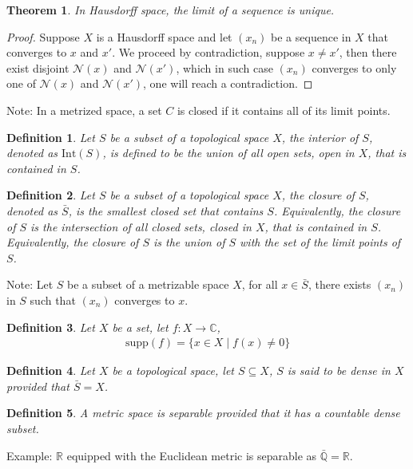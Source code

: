 \documentclass[11pt]{book}
\theoremstyle{break}
\theoremstyle{break}
\newtheorem{thm}{Theorem}[section]
\newtheorem{defn}{Definition}[corL]
\newcommand{\R}{\mathbb{R}}
\newcommand{\Q}{\mathbb{Q}}
\newcommand{\C}{\mathbb{C}}
\newcommand{\Int}{\text{Int}}
\newcommand{\supp}{\text{supp}}
\newcommand{\note}{\color{red}Note: \color{black}}
\newcommand{\example}{\color{green}Example: \color{black}}
\begin{document}
\begin{thm}
In Hausdorff space, the limit of a sequence is unique. 
\end{thm}
\begin{proof}
Suppose $X$ is a Hausdorff space and let $(x_n)$ be a sequence in $X$ that converges to $x$ and $x'$. We proceed by contradiction, suppose $x \neq x'$, then there exist disjoint $\mathcal{N}(x)$ and $\mathcal{N}(x')$, which in such case $(x_n)$ converges to only one of $\mathcal{N}(x)$ and $\mathcal{N}(x')$, one will reach a contradiction.
\end{proof}

\note In a metrized space, a set $C$ is closed if it contains all of its limit points. 

\begin{defn}
Let $S$ be a subset of a topological space $X$, the interior of $S$, denoted as $\Int(S)$, is defined to be the union of all open sets, open in $X$, that is contained in $S$. 
\end{defn}

\begin{defn}
Let $S$ be a subset of a topological space $X$, the closure of $S$, denoted as $\bar{S}$, is the smallest closed set that contains $S$. Equivalently, the closure of $S$ is the intersection of all closed sets, closed in $X$, that is contained in $S$. Equivalently, the closure of $S$ is the union of $S$ with the set of the limit points of $S$. 
\end{defn}

\note Let $S$ be a subset of a metrizable space $X$, for all $x \in \bar{S}$, there exists $(x_n)$ in $S$ such that $(x_n)$ converges to $x$. 

\begin{defn}
Let $X$ be a set, let $f:X \to \C$, 
\begin{align*}
\supp(f)=\{ x \in X\mid f(x) \neq 0\}
\end{align*}
\end{defn}

\begin{defn}
Let $X$ be a topological space, let $S\subseteq X$, $S$ is said to be dense in $X$ provided that $\bar{S} = X$.
\end{defn}

\begin{defn}
A metric space is separable provided that it has a countable dense subset. 
\end{defn}

\example $\R$ equipped with the Euclidean metric is separable as $\bar{\Q} = \R$. \\
\end{document}
